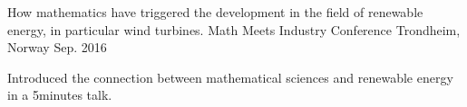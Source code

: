 

\begin{cventries}

  \cventry
    {How mathematics have triggered the development in the field of renewable energy, in particular wind turbines.} %
    {Math Meets Industry Conference} %
    {Trondheim, Norway} %
    {Sep. 2016} %
    {
      \begin{cvitems} %
        \item {Introduced the connection between mathematical sciences and renewable energy in a 5minutes talk.}
      \end{cvitems}
    }

\end{cventries}
